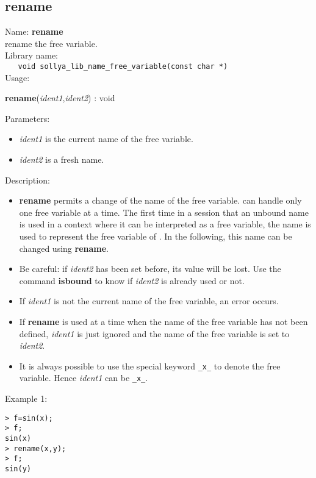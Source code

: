 \subsection{rename}
\label{labrename}
\noindent Name: \textbf{rename}\\
\phantom{aaa}rename the free variable.\\[0.2cm]
\noindent Library name:\\
\verb|   void sollya_lib_name_free_variable(const char *)|\\[0.2cm]
\noindent Usage: 
\begin{center}
\textbf{rename}(\emph{ident1},\emph{ident2}) : \textsf{void}\\
\end{center}
Parameters: 
\begin{itemize}
\item \emph{ident1} is the current name of the free variable.
\item \emph{ident2} is a fresh name.
\end{itemize}
\noindent Description: \begin{itemize}

\item \textbf{rename} permits a change of the name of the free variable. \sollya can handle
   only one free variable at a time. The first time in a session that an
   unbound name is used in a context where it can be interpreted as a free
   variable, the name is used to represent the free variable of \sollya. In the
   following, this name can be changed using \textbf{rename}.

\item Be careful: if \emph{ident2} has been set before, its value will be lost. Use
   the command \textbf{isbound} to know if \emph{ident2} is already used or not.

\item If \emph{ident1} is not the current name of the free variable, an error occurs.

\item If \textbf{rename} is used at a time when the name of the free variable has not been
   defined, \emph{ident1} is just ignored and the name of the free variable is set
   to \emph{ident2}.

\item It is always possible to use the special keyword \verb|_x_| to denote the free
   variable. Hence \emph{ident1} can be \verb|_x_|.
\end{itemize}
\noindent Example 1: 
\begin{center}\begin{minipage}{15cm}\begin{Verbatim}[frame=single]
> f=sin(x);
> f;
sin(x)
> rename(x,y);
> f;
sin(y)
\end{Verbatim}
\end{minipage}\end{center}
